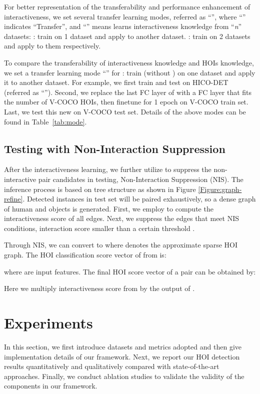 \documentclass[10pt,twocolumn,letterpaper]{article}
\begin{document}
For better representation of the transferability and performance enhancement of interactiveness, we set several transfer learning modes, referred as ``'',
where ``'' indicates ``Transfer'', and ``'' means  learns interactiveness knowledge from ``\emph{n}'' datasets:
: train  on 1 dataset and apply  to another dataset.
: train  on 2 datasets and apply  to them respectively. 

To compare the transferability of interactiveness knowledge and HOIs knowledge, we set a transfer learning mode ``'' for :
 train  (without ) on one dataset and apply it to another dataset. For example, we first train and test  on HICO-DET (referred as ``''). 
Second, we replace the last FC layer of  with a FC layer that fits the number of V-COCO HOIs, then finetune  for 1 epoch on V-COCO train set. 
Last, we test this new  on V-COCO test set.
Details of the above modes can be found in Table~\ref{tab:mode}.

\subsection{Testing with Non-Interaction Suppression}
\label{sec:test}
After the interactiveness learning,  we further utilize  to suppress the non-interactive pair candidates in testing, \ie Non-Interaction Suppression (NIS). The inference process is based on tree structure as shown in Figure \ref{Figure:graph-refine}. Detected instances in test set will be paired exhaustively, so a dense graph  of human and objects is generated. First, we employ  to compute the interactiveness score of all edges. Next, we suppress the edges that meet NIS conditions, \ie interaction score  smaller than a certain threshold .

Through NIS, we can convert  to  where  denotes the approximate sparse HOI graph. 
The HOI classification score vector  of  from  is:

where  are input features. The final HOI score vector of a pair  can be obtained by:

Here we multiply interactiveness score  from  by the output of .

\section{Experiments}
\label{sec:experiment}
In this section, we first introduce datasets and metrics adopted and then give implementation details of our framework. Next, we report our HOI detection results quantitatively and qualitatively compared with state-of-the-art approaches. Finally, we conduct ablation studies to validate the validity of the components in our framework. 
\end{document}

